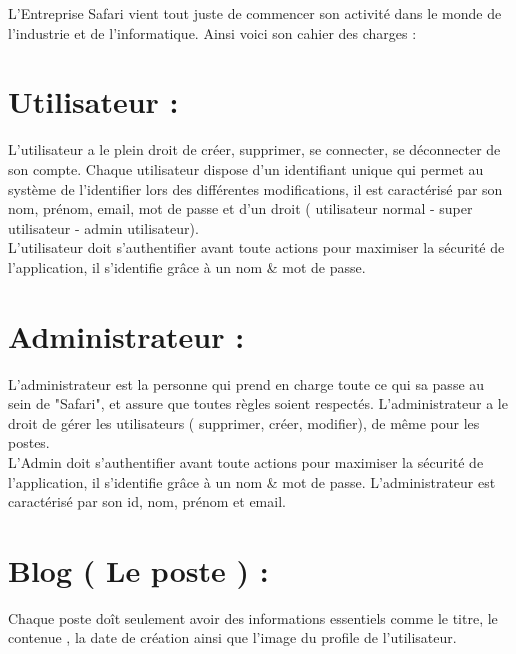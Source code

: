   \setcounter{section}{0} %
\renewcommand{\thesection}{\arabic{section}} %
\setcounter{subsection}{0} %
L'Entreprise Safari vient tout juste de commencer son activité dans le monde de l'industrie et de l'informatique. Ainsi voici son cahier des charges :
\section{Utilisateur :}

L'utilisateur a le plein droit de créer, supprimer, se connecter, se déconnecter de son compte. Chaque utilisateur dispose d'un identifiant unique qui permet au système de l'identifier lors des différentes modifications, il est caractérisé par son nom, prénom, email, mot de passe et d'un droit ( utilisateur normal - super utilisateur - admin utilisateur). \\

L’utilisateur doit s’authentifier avant toute actions pour maximiser la sécurité 
de l’application, il s’identifie grâce à un nom \& mot de passe. 

\section{Administrateur :}

L'administrateur est la personne qui prend en charge toute ce qui sa passe au sein de "Safari", et assure que toutes règles soient respectés. L'administrateur a le droit de gérer les utilisateurs ( supprimer, créer, modifier), de même pour les postes. \\

L’Admin doit s’authentifier avant toute actions pour maximiser la sécurité 
de l’application, il s’identifie grâce à un nom \& mot de passe.  
L'administrateur est caractérisé par son id, nom, prénom et email.

\section{Blog ( Le poste ) :}

Chaque poste doît seulement avoir des informations essentiels comme le titre, le contenue , la date de création ainsi que l'image du profile de l'utilisateur.

